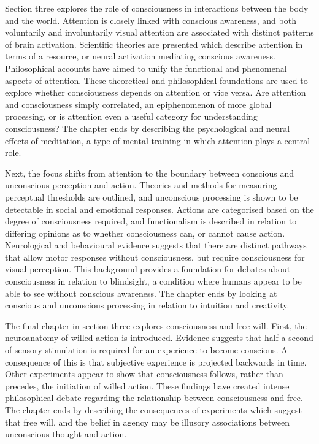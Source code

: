 \documentclass[a4paper]{article}
\begin{document}
Section three explores the role of consciousness in interactions between the
body and the world. Attention is closely linked with conscious awareness, and
both voluntarily and involuntarily visual attention are associated with
distinct patterns of brain activation. Scientific theories are presented which
describe attention in terms of a resource, or neural activation mediating
conscious awareness. Philosophical accounts have aimed to unify the functional
and phenomenal aspects of attention. These theoretical and philosophical
foundations are used to explore whether consciousness depends on attention or
vice versa. Are attention and consciousness simply correlated, an
epiphenomenon of more global processing, or is attention even a useful
category for understanding consciousness? The chapter ends by describing the
psychological and neural effects of meditation, a type of mental training in
which attention plays a central role.

Next, the focus shifts from attention to the boundary between conscious and
unconscious perception and action. Theories and methods for measuring
perceptual thresholds are outlined, and unconscious processing is shown to be
detectable in social and emotional responses. Actions are categorised based on
the degree of consciousness required, and functionalism is described in
relation to differing opinions as to whether consciousness can, or cannot
cause action. Neurological and behavioural evidence suggests that there are
distinct pathways that allow motor responses without consciousness, but
require consciousness for visual perception. This background provides a
foundation for debates about consciousness in relation to blindsight, a
condition where humans appear to be able to see without conscious awareness.
The chapter ends by looking at conscious and unconscious processing in
relation to intuition and creativity.

The final chapter in section three explores consciousness and free will.
First, the neuroanatomy of willed action is introduced. Evidence suggests that
half a second of sensory stimulation is required for an experience to become
conscious. A consequence of this is that subjective experience is projected
backwards in time. Other experiments appear to show that consciousness
follows, rather than precedes, the initiation of willed action. These findings
have created intense philosophical debate regarding the relationship between
consciousness and free. The chapter ends by describing the consequences of
experiments which suggest that free will, and the belief in agency may be
illusory associations between unconscious thought and action.
\end{document}
